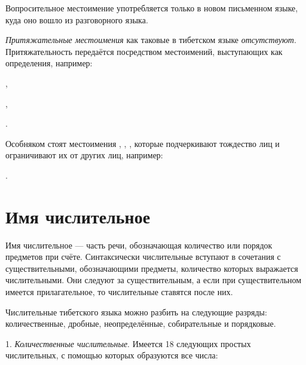 Вопросительное местоимение  употребляется только в новом письменном языке, куда оно вошло из разговорного языка.

\emph{Притяжательные местоимения} как таковые в тибетском языке \emph{отсутствуют}. Притяжательность передаётся посредством местоимений, выступающих как определения, например:
\begin{prfsample}
    \item {},
    \item {},
    \item {}.
\end{prfsample}

Особняком стоят местоимения	, , , которые подчеркивают тождество лиц и ограничивают их от других лиц, например:
\begin{prfsample}
    \item {}.    
\end{prfsample}

\section{Имя числительное}

Имя числительное --- часть речи, обозначающая количество или порядок предметов при счёте. Синтаксически числительные вступают в сочетания с существительными, обозначающими предметы, количество которых выражается числительными. Они следуют за существительным, а если при существительном имеется прилагательное, то числительные ставятся после них.

Числительные тибетского языка можно разбить на следующие разряды: количественные, дробные, неопределённые, собирательные и порядковые.

1. \emph{Количественные числительные}. Имеется 18 следующих простых числительных, с помощью которых образуются все числа:


